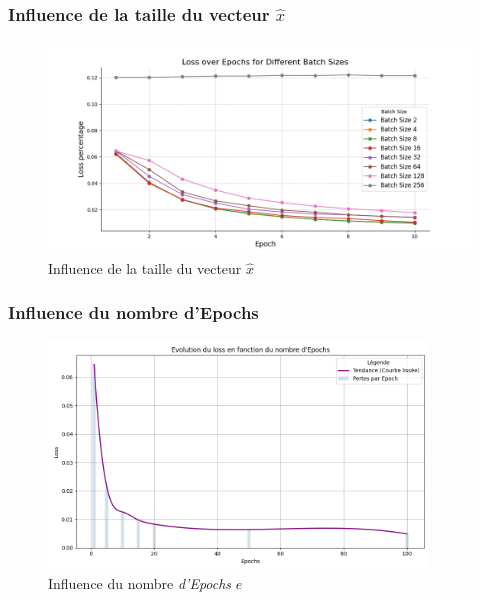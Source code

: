 \documentclass{article}
\begin{document}
\subsubsection{Influence de la taille du vecteur $\hat{x}$}

\vspace{-1em}

\begin{figure}[H]
    \centering
    \includegraphics[width=1\textwidth]{src/batchsize.png}
    \vspace{-1em}
    \caption{Influence de la taille du vecteur $\hat{x}$}
    \label{fig:xhat}
\end{figure}

\subsubsection{Influence du nombre d'Epochs}

\vspace{-1em}

\begin{figure}[H]
    \centering
    \includegraphics[width=0.9\textwidth]{src/epoch.png}
    \caption{Influence du nombre \textit{d'Epochs} $e$}
    \vspace{-1em}
    \label{fig:epochs}
\end{figure}
\end{document}
